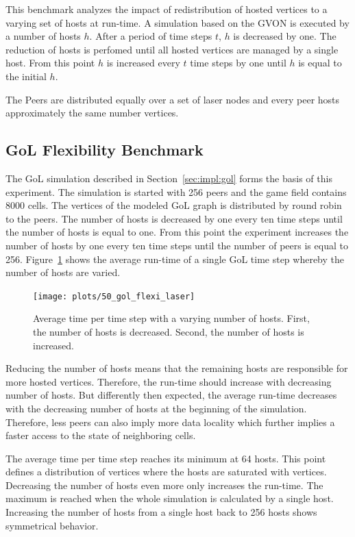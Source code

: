 This benchmark analyzes the impact of redistribution of hosted
vertices to a varying set of hosts at run-time. A simulation based on the
GVON is executed by a number of hosts $h$. After a period of time steps
$t$, $h$ is decreased by one. The reduction of hosts is perfomed until
all hosted vertices are managed by a single host. From this point $h$
is increased every $t$ time steps by one until $h$ is equal to the
initial $h$.

The Peers are distributed equally over a set of laser nodes and
every peer hosts approximately the same number vertices.

\subsection{GoL Flexibility Benchmark}

The GoL simulation described in Section~\ref{sec:impl:gol} forms the
basis of this experiment.  The simulation is started with 256 peers
and the game field contains 8000 cells. The vertices of the modeled
GoL graph is distributed by round robin to the peers.  The number of
hosts is decreased by one every ten time steps until the number of
hosts is equal to one. From this point the experiment increases the
number of hosts by one every ten time steps until the number of peers
is equal to 256. Figure~\ref{fig:gol_flexi_laser} shows the
average run-time of a single GoL time step whereby the number of hosts
are varied.

\begin{figure}[H]
  \texttt{[image: plots/50\_gol\_flexi\_laser]}
  \label{fig:gol_flexi_laser}
  \caption{Average time per time step with a varying number of
    hosts. First, the number of hosts is decreased. Second, the number
    of hosts is increased.}
\end{figure}

\noindent Reducing the number of hosts means that the remaining hosts are
responsible for more hosted vertices. Therefore, the run-time should increase
with decreasing number of hosts.  But differently then expected, the
average run-time decreases with the decreasing number of hosts at the
beginning of the simulation. Therefore, less peers can also imply more
data locality which further implies a faster access to the state of
neighboring cells.

The average time per time step reaches its minimum at 64 hosts. This
point defines a distribution of vertices where the hosts are saturated
with vertices.  Decreasing the number of hosts even more only
increases the run-time. The maximum is reached when the whole
simulation is calculated by a single host.  Increasing the number of
hosts from a single host back to 256 hosts shows symmetrical behavior.


